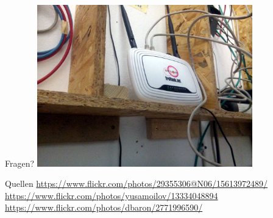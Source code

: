 \documentclass[10pt]{beamer}
\begin{document}
\begin{frame}{Fragen?}
\vfill
\centering
\includegraphics[width=0.7\textwidth]{images/irl_router}
\vfill
\end{frame}

\begin{frame}{Quellen}
\url{https://www.flickr.com/photos/29355306@N06/15613972489/}\\
\url{https://www.flickr.com/photos/yusamoilov/13334048894}\\
\url{https://www.flickr.com/photos/dbaron/2771996590/}
\end{frame}
\end{document}
